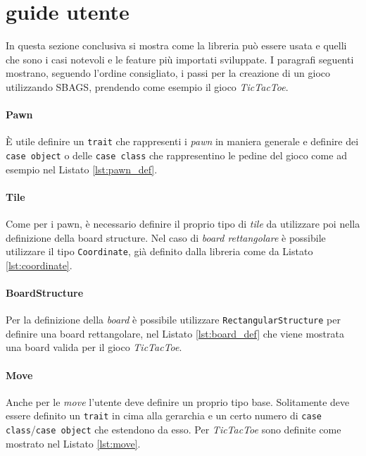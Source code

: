 \section{guide utente}
%
In questa sezione conclusiva si mostra come la libreria può essere usata e quelli che sono i casi notevoli e le feature più importati sviluppate.
%
I paragrafi seguenti mostrano, seguendo l'ordine consigliato, i passi per la creazione di un gioco utilizzando SBAGS, prendendo come esempio il gioco \textit{TicTacToe}.

\paragraph{Pawn}
%
È utile definire un \texttt{trait} che rappresenti i \textit{pawn} in maniera generale e definire dei \texttt{case object} o delle \texttt{case class} che rappresentino le pedine del gioco come ad esempio nel Listato \ref{lst:pawn_def}.
%


\paragraph{Tile}
%
Come per i pawn, è necessario definire il proprio tipo di \textit{tile} da utilizzare poi nella definizione della board structure.
%
Nel caso di \textit{board rettangolare} è possibile utilizzare il tipo \texttt{Coordinate}, già definito dalla libreria come da Listato \ref{lst:coordinate}.
%


\paragraph{BoardStructure}
%
Per la definizione della \textit{board} è possibile utilizzare \texttt{Rec\-tan\-gu\-lar\-Struc\-ture} per definire una board rettangolare, nel Listato \ref{lst:board_def} che viene mostrata una board valida per il gioco \textit{TicTacToe}.
%


\paragraph{Move}
Anche per le \textit{move} l'utente deve definire un proprio tipo base.
%
Solitamente deve essere definito un \texttt{trait} in cima alla gerarchia e un certo numero di \texttt{case class}/\texttt{case object} che estendono da esso.
%
Per \textit{TicTacToe} sono definite come mostrato nel Listato \ref{lst:move}.
%


